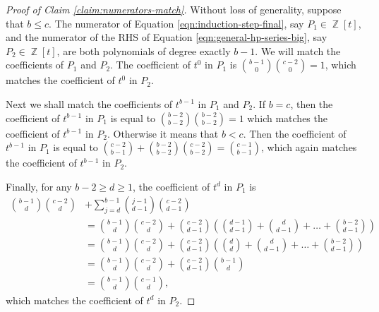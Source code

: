 \documentclass[11pt,reqno]{amsart}
\DeclareMathOperator{\Z}{\mathbb{Z}}
\theoremstyle{definition}
\numberwithin{equation}{section}
\begin{document}
\begin{proof}[Proof of Claim \ref{claim:numerators-match}]
Without loss of generality, suppose that $b \le c$. The numerator of Equation \eqref{eqn:induction-step-final}, say $P_1 \in \Z[t]$, and the numerator of the RHS of Equation \eqref{eqn:general-hp-series-big}, say $P_2 \in \Z[t]$, are both polynomials of degree exactly $b-1$. We will match the coefficients of $P_1$ and $P_2$. The coefficient of $t^0$ in $P_1$ is $\binom{b-1}{0}\binom{c - 2}{0} = 1$, which matches the coefficient of $t^0$ in $P_2$. 

Next we shall match the coefficients of $t^{b-1}$ in $P_1$ and $P_2$. If $b = c$, then the coefficient of $t^{b-1}$ in $P_1$ is equal to $\binom{b-2}{b-2}\binom{b-2}{b-2} = 1$ which matches the coefficient of $t^{b-1}$ in $P_2$. Otherwise it means that $b < c$. Then the coefficient of $t^{b-1}$ in $P_1$ is equal to $\binom{c-2}{b-1} + \binom{b-2}{b-2}\binom{c-2}{b-2} = \binom{c-1}{b-1}$, which again matches the coefficient of $t^{b-1}$ in $P_2$.

Finally, for any $b-2 \ge d \ge 1$, the coefficient of $t^d$ in $P_1$ is
\begin{align}
\binom{b-1}{d}\binom{c-2}{d} &+ \sum_{j=d}^{b-1} \binom{j-1}{d-1}\binom{c-2}{d-1} \nonumber \\
&= \binom{b-1}{d}\binom{c-2}{d} + \binom{c-2}{d-1}\left(\binom{d-1}{d-1} + \binom{d}{d-1} + \ldots + \binom{b-2}{d-1}\right) \nonumber \\
&= \binom{b-1}{d}\binom{c-2}{d} + \binom{c-2}{d-1}\left(\binom{d}{d} + \binom{d}{d-1} + \ldots + \binom{b-2}{d-1}\right) \nonumber \\
&= \binom{b-1}{d}\binom{c-2}{d} + \binom{c-2}{d-1}\binom{b-1}{d} \nonumber \\
&= \binom{b-1}{d}\binom{c-1}{d} \nonumber,
\end{align}
which matches the coefficient of $t^d$ in $P_2$.
\end{proof}
\end{document}
